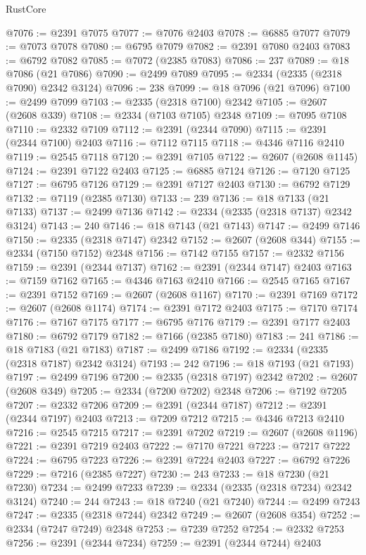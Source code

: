 \begin{lexlean}{RustCore}
\begin{coremodule}
@7076 := @2391 @7075
@7077 := @7076 @2403
@7078 := @6885 @7077
@7079 := @7073 @7078
@7080 := @6795 @7079
@7082 := @2391 @7080 @2403
@7083 := @6792 @7082
@7085 := @7072 (@2385 @7083)
@7086 := 237
@7089 := @18 @7086 (@21 @7086)
@7090 := @2499 @7089
@7095 := @2334 (@2335 (@2318 @7090) @2342 @3124)
@7096 := 238
@7099 := @18 @7096 (@21 @7096)
@7100 := @2499 @7099
@7103 := @2335 (@2318 @7100) @2342
@7105 := @2607 (@2608 @339)
@7108 := @2334 (@7103 @7105) @2348
@7109 := @7095 @7108
@7110 := @2332 @7109
@7112 := @2391 (@2344 @7090)
@7115 := @2391 (@2344 @7100) @2403
@7116 := @7112 @7115
@7118 := @4346 @7116 @2410
@7119 := @2545 @7118
@7120 := @2391 @7105
@7122 := @2607 (@2608 @1145)
@7124 := @2391 @7122 @2403
@7125 := @6885 @7124
@7126 := @7120 @7125
@7127 := @6795 @7126
@7129 := @2391 @7127 @2403
@7130 := @6792 @7129
@7132 := @7119 (@2385 @7130)
@7133 := 239
@7136 := @18 @7133 (@21 @7133)
@7137 := @2499 @7136
@7142 := @2334 (@2335 (@2318 @7137) @2342 @3124)
@7143 := 240
@7146 := @18 @7143 (@21 @7143)
@7147 := @2499 @7146
@7150 := @2335 (@2318 @7147) @2342
@7152 := @2607 (@2608 @344)
@7155 := @2334 (@7150 @7152) @2348
@7156 := @7142 @7155
@7157 := @2332 @7156
@7159 := @2391 (@2344 @7137)
@7162 := @2391 (@2344 @7147) @2403
@7163 := @7159 @7162
@7165 := @4346 @7163 @2410
@7166 := @2545 @7165
@7167 := @2391 @7152
@7169 := @2607 (@2608 @1167)
@7170 := @2391 @7169
@7172 := @2607 (@2608 @1174)
@7174 := @2391 @7172 @2403
@7175 := @7170 @7174
@7176 := @7167 @7175
@7177 := @6795 @7176
@7179 := @2391 @7177 @2403
@7180 := @6792 @7179
@7182 := @7166 (@2385 @7180)
@7183 := 241
@7186 := @18 @7183 (@21 @7183)
@7187 := @2499 @7186
@7192 := @2334 (@2335 (@2318 @7187) @2342 @3124)
@7193 := 242
@7196 := @18 @7193 (@21 @7193)
@7197 := @2499 @7196
@7200 := @2335 (@2318 @7197) @2342
@7202 := @2607 (@2608 @349)
@7205 := @2334 (@7200 @7202) @2348
@7206 := @7192 @7205
@7207 := @2332 @7206
@7209 := @2391 (@2344 @7187)
@7212 := @2391 (@2344 @7197) @2403
@7213 := @7209 @7212
@7215 := @4346 @7213 @2410
@7216 := @2545 @7215
@7217 := @2391 @7202
@7219 := @2607 (@2608 @1196)
@7221 := @2391 @7219 @2403
@7222 := @7170 @7221
@7223 := @7217 @7222
@7224 := @6795 @7223
@7226 := @2391 @7224 @2403
@7227 := @6792 @7226
@7229 := @7216 (@2385 @7227)
@7230 := 243
@7233 := @18 @7230 (@21 @7230)
@7234 := @2499 @7233
@7239 := @2334 (@2335 (@2318 @7234) @2342 @3124)
@7240 := 244
@7243 := @18 @7240 (@21 @7240)
@7244 := @2499 @7243
@7247 := @2335 (@2318 @7244) @2342
@7249 := @2607 (@2608 @354)
@7252 := @2334 (@7247 @7249) @2348
@7253 := @7239 @7252
@7254 := @2332 @7253
@7256 := @2391 (@2344 @7234)
@7259 := @2391 (@2344 @7244) @2403

\end{coremodule}
\end{lexlean}
